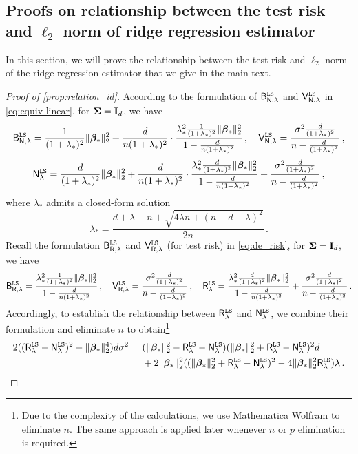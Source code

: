\subsection{Proofs on relationship between the test risk and \texorpdfstring{$\ell_2$}{L2} norm of ridge regression estimator}
\label{app:relationship}

In this section, we will prove the relationship between the test risk and $\ell_2$ norm of the ridge regression estimator that we give in the main text.



\label{proof:linear:relation}
\begin{proof}[Proof of \cref{prop:relation_id}]
According to the formulation of $\mathsf B_{\mathsf N,\lambda}^{\tt LS}$ and $\mathsf V_{\mathsf N,\lambda}^{\tt LS}$ in \cref{eq:equiv-linear}, for ${\boldsymbol \Sigma}={\mathbf I}_d$, we have
\[
    \mathsf B_{\mathsf N,\lambda}^{\tt LS} = \frac{1}{(1+\lambda_*)^2}\|{\boldsymbol \beta}_*\|_2^2 + \frac{d}{n(1+\lambda_*)^2} \cdot \frac{\lambda_*^2 \frac{1}{(1+\lambda_*)^2}\|{\boldsymbol \beta}_*\|_2^2}{1-\frac{d}{n(1+\lambda_*)^2}} \,, \quad \mathsf V_{\mathsf N,\lambda}^{\tt LS} = \frac{\sigma^2\frac{d}{(1+\lambda_*)^2}}{n-\frac{d}{(1+\lambda_*)^2}}\,,
\]
\[
    \mathsf N_{\lambda}^{\tt LS} = \frac{d}{(1+\lambda_*)^2}\|{\boldsymbol \beta}_*\|_2^2 + \frac{d}{n(1+\lambda_*)^2} \cdot \frac{\lambda_*^2 \frac{d}{(1+\lambda_*)^2}\|{\boldsymbol \beta}_*\|_2^2}{1-\frac{d}{n(1+\lambda_*)^2}} + \frac{\sigma^2\frac{d}{(1+\lambda_*)^2}}{n-\frac{d}{(1+\lambda_*)^2}}\,,
\]
where $\lambda_*$ admits a closed-form solution
\[
\lambda_*=\frac{d+\lambda-n+\sqrt{4\lambda n + (n-d-\lambda)^2}}{2n} \,.
\]
Recall the formulation $\mathsf B_{\mathsf R,\lambda}^{\tt LS}$ and $\mathsf V_{\mathsf R,\lambda}^{\tt LS}$ (for test risk) in \cref{eq:de_risk}, for ${\boldsymbol \Sigma}={\mathbf I}_d$, we have
\[
\begin{aligned}
    \mathsf B_{\mathsf R,\lambda}^{\tt LS} = \frac{\lambda_*^2 \frac{1}{(1+\lambda_*)^2}\|{\boldsymbol \beta}_*\|_2^2}{1-\frac{d}{n(1+\lambda_*)^2}} \,, \quad \mathsf V_{\mathsf R,\lambda}^{\tt LS} = \frac{\sigma^2\frac{d}{(1+\lambda_*)^2}}{n-\frac{d}{(1+\lambda_*)^2}}\,, \quad
    \mathsf R_{\lambda}^{\tt LS} = \frac{\lambda_*^2 \frac{d}{(1+\lambda_*)^2}\|{\boldsymbol \beta}_*\|_2^2}{1-\frac{d}{n(1+\lambda_*)^2}} + \frac{\sigma^2\frac{d}{(1+\lambda_*)^2}}{n-\frac{d}{(1+\lambda_*)^2}}\,.
\end{aligned}
\]
Accordingly, to establish the relationship between $\mathsf R_{\lambda}^{\tt LS}$ and $\mathsf N_{\lambda}^{\tt LS}$, we combine their formulation and eliminate $n$ to obtain\footnote{Due to the complexity of the calculations, we use Mathematica Wolfram to eliminate $n$. The same approach is applied later whenever $n$ or $p$ elimination is required.}
\[
\begin{aligned}
    2( (\mathsf R^{\tt LS}_{\lambda} - \mathsf N^{\tt LS}_{\lambda})^2 - \|{\boldsymbol \beta}_*\|_2^4 ) d \sigma^2 =&~ (\|{\boldsymbol \beta}_*\|_2^2 - \mathsf R^{\tt LS}_{\lambda} - \mathsf N^{\tt LS}_{\lambda})(\|{\boldsymbol \beta}_*\|_2^2 + \mathsf R^{\tt LS}_{\lambda} - \mathsf N^{\tt LS}_{\lambda})^2d\\
    &~+ 2\|{\boldsymbol \beta}_*\|_2^2((\|{\boldsymbol \beta}_*\|_2^2 + \mathsf R^{\tt LS}_{\lambda} - \mathsf N^{\tt LS}_{\lambda})^2-4\|{\boldsymbol \beta}_*\|_2^2\mathsf R^{\tt LS}_{\lambda} ) \lambda\,.
\end{aligned}
\]
\end{proof}

